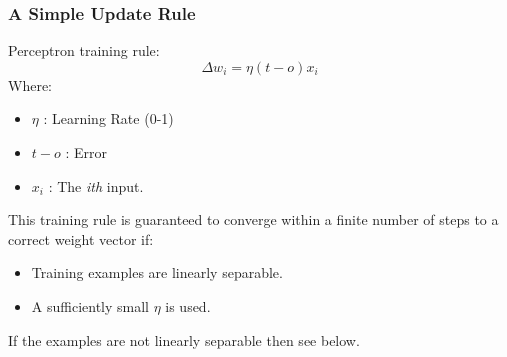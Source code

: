 \documentclass[11pt]{article}
\begin{document}
\subsubsection{A Simple Update Rule}
\label{sec:orgcd1a7f1}
Perceptron training rule:
\begin{equation}
{\Delta}w_i = \eta(t - o)x_i
\end{equation}
Where:
\begin{itemize}
\item \(\eta\) : Learning Rate (0-1)
\item \(t - o\) : Error
\item \(x_i\) : The \emph{ith} input.
\end{itemize}
This training rule is guaranteed to converge within a finite number of steps to a correct weight vector if:
\begin{itemize}
\item Training examples are linearly separable.
\item A sufficiently small \(\eta\) is used.
\end{itemize}
If the examples are not linearly separable then see below.
\end{document}
